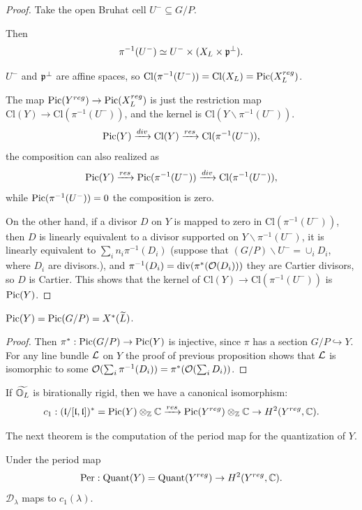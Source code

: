 \begin{proof}
  Take the open Bruhat cell $U^- \subseteq G/P$.

  Then
  \[
      \pi^{-1}(U^-) \simeq U^- \times (X_L \times \mathfrak{p}^{\perp}).
  \]

  $U^-$ and $\mathfrak{p}^{\perp}$ are affine spaces, so $\mathrm{Cl}(\pi^{-1}(U^-)) = \mathrm{Cl}(X_L) = \operatorname{Pic}(X_L^{reg})$.

  The map $\operatorname{Pic}(Y^{reg}) \to \operatorname{Pic}(X_L^{reg})$ is just the restriction map $\mathrm{Cl}(Y) \to \mathrm{Cl}(\pi^{-1}(U^-))$, and the kernel is $\mathrm{Cl}(Y \backslash \pi^{-1}(U^-))$.
  \[
    \operatorname{Pic}(Y) \xrightarrow{div} \mathrm{Cl}(Y) \xrightarrow{res} \mathrm{Cl}(\pi^{-1}(U^-)),
  \]
  the composition can also realized as
  \[
    \operatorname{Pic}(Y) \xrightarrow{res} \operatorname{Pic}(\pi^{-1}(U^-)) \xrightarrow{div} \mathrm{Cl}(\pi^{-1}(U^-)),
  \]
  while $\operatorname{Pic}(\pi^{-1}(U^-)) = 0$ the composition is zero.

  On the other hand, if a divisor $D$ on $Y$ is mapped to zero in $\mathrm{Cl}(\pi^{-1}(U^-))$, then $D$ is linearly equivalent to a divisor supported on $Y \backslash \pi^{-1}(U^-)$, it is linearly equivalent to $\sum_i n_i \pi^{-1}(D_i)$ (suppose that $(G/P) \backslash U^- = \cup_i D_i$, where $D_i$ are divisors.), and $\pi^{-1}(D_i) = \mathrm{div}(\pi^*(\mathcal{O}(D_i)))$ they are Cartier divisors, so $D$ is Cartier. This shows that the kernel of $\mathrm{Cl}(Y) \to \mathrm{Cl}(\pi^{-1}(U^-))$ is $\operatorname{Pic}(Y)$.
\end{proof}

\begin{prop}
  $\operatorname{Pic}(Y) = \operatorname{Pic}(G/P) = X^*(\widetilde{L})$.
\end{prop}

\begin{proof}
  Then $\pi^*: \operatorname{Pic}(G/P) \to \operatorname{Pic}(Y)$ is injective, since $\pi$ has a section $G/P \hookrightarrow Y$.
  For any line bundle $\mathcal{L}$ on $Y$ the proof of previous proposition shows that $\mathcal{L}$ is isomorphic to some $\mathcal{O}(\sum_i \pi^{-1}(D_i)) = \pi^*(\mathcal{O}(\sum_i D_i))$.
\end{proof}

\begin{cor}
  If $\widetilde{\mathbb{O}_L}$ is birationally rigid, then we have a canonical isomorphism:
  \[
    c_1: (\mathfrak{l}/[\mathfrak{l},\mathfrak{l}])^* = \operatorname{Pic}(Y) \otimes_{\mathbb{Z}} \mathbb{C} \xrightarrow{res} \operatorname{Pic}(Y^{reg}) \otimes_{\mathbb{Z}} \mathbb{C} \to H^2(Y^{reg},\mathbb{C}).
  \]
\end{cor}


The next theorem is the computation of the period map for the quantization of $Y$.
\begin{thm}
  Under the period map
  \[
    \mathrm{Per}: \mathrm{Quant}(Y) = \mathrm{Quant}(Y^{reg}) \to H^2(Y^{reg},\mathbb{C}).
  \]
  $\mathcal{D}_{\lambda}$ maps to $c_1(\lambda)$.
\end{thm}


